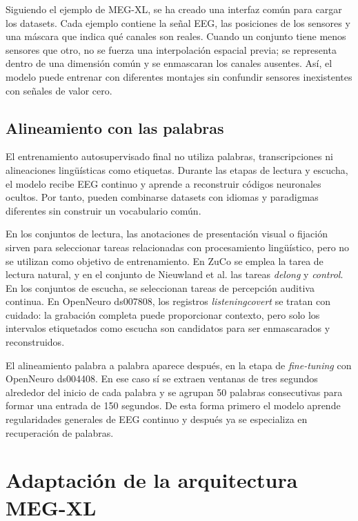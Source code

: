 Siguiendo el ejemplo de MEG-XL, se ha creado una interfaz común para cargar los datasets. Cada ejemplo contiene la señal EEG, las posiciones de los sensores y una máscara que indica qué canales son reales. Cuando un conjunto tiene menos sensores que otro, no se fuerza una interpolación espacial previa; se representa dentro de una dimensión común y se enmascaran los canales ausentes. Así, el modelo puede entrenar con diferentes montajes sin confundir sensores inexistentes con señales de valor cero.



\subsection{Alineamiento con las palabras}

El entrenamiento autosupervisado final no utiliza palabras, transcripciones ni alineaciones lingüísticas como etiquetas. Durante las etapas de lectura y escucha, el modelo recibe EEG continuo y aprende a reconstruir códigos neuronales ocultos. Por tanto, pueden combinarse datasets con idiomas y paradigmas diferentes sin construir un vocabulario común.

En los conjuntos de lectura, las anotaciones de presentación visual o fijación sirven para seleccionar tareas relacionadas con procesamiento lingüístico, pero no se utilizan como objetivo de entrenamiento. En ZuCo se emplea la tarea de lectura natural, y en el conjunto de Nieuwland et al. las tareas \textit{delong} y \textit{control}. En los conjuntos de escucha, se seleccionan tareas de percepción auditiva continua. En OpenNeuro ds007808, los registros \textit{listeningcovert} se tratan con cuidado: la grabación completa puede proporcionar contexto, pero solo los intervalos etiquetados como escucha son candidatos para ser enmascarados y reconstruidos.

El alineamiento palabra a palabra aparece después, en la etapa de \textit{fine-tuning} con OpenNeuro ds004408. En ese caso sí se extraen ventanas de tres segundos alrededor del inicio de cada palabra y se agrupan 50 palabras consecutivas para formar una entrada de 150 segundos. De esta forma primero el modelo aprende regularidades generales de EEG continuo y después ya se especializa en recuperación de palabras.

\section{Adaptación de la arquitectura MEG-XL}

